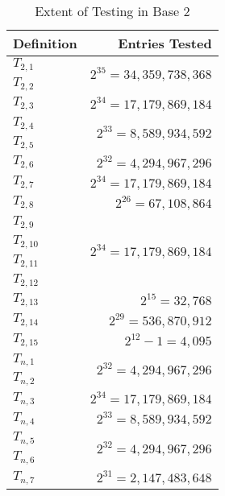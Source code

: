 \documentclass[conference]{IEEEtran}
\begin{document}
\renewcommand{\arraystretch}{1.25}
\begin{table}[H]
\label{tab:testing_b2}
\caption{Extent of Testing in Base 2}
\centering
\begin{tabular}{|l|r|}
\hline
\textbf{Definition} & \textbf{Entries Tested}      \\ \hline
$T_{2,1}$  &\multirow{2}{*}{$2^{35}=34,359,738,368$}\\ \cline{1-1}
$T_{2,2}$  &                              \\ \hline
$T_{2,3}$  & $2^{34} = 17,179,869,184$    \\ \hline
$T_{2,4}$  &\multirow{2}{*}{$2^{33}=8,589,934,592$}\\ \cline{1-1}
$T_{2,5}$  &                              \\ \hline
$T_{2,6}$  & $2^{32} = 4,294,967,296$     \\ \hline
$T_{2,7}$  & $2^{34} = 17,179,869,184$    \\ \hline
$T_{2,8}$  & $2^{26} = 67,108,864$        \\ \hline
$T_{2,9}$  &\multirow{4}{*}{$2^{34}=17,179,869,184$}\\ \cline{1-1}
$T_{2,10}$ &                              \\ \cline{1-1}
$T_{2,11}$ &                              \\ \cline{1-1}
$T_{2,12}$ &                              \\ \hline
$T_{2,13}$ & $2^{15} = 32,768$            \\ \hline
$T_{2,14}$ & $2^{29} = 536,870,912$       \\ \hline
$T_{2,15}$ & $2^{12} - 1 = 4,095$         \\ \hline
$T_{n,1}$  &\multirow{2}{*}{$2^{32}=4,294,967,296$}\\ \cline{1-1}
$T_{n,2}$  &                              \\ \hline
$T_{n,3}$  & $2^{34} = 17,179,869,184$    \\ \hline
$T_{n,4}$  & $2^{33} = 8,589,934,592$     \\ \hline
$T_{n,5}$  &\multirow{2}{*}{$2^{32}=4,294,967,296$}\\ \cline{1-1}
$T_{n,6}$  &                              \\ \hline
$T_{n,7}$  & $2^{31} = 2,147,483,648$     \\ \hline
\end{tabular}
\end{table}
\end{document}
